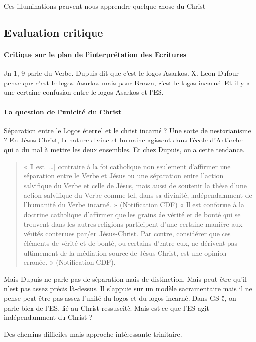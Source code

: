  
Ces illuminations peuvent nous apprendre quelque chose du Christ

\subsection{ Evaluation critique }

\paragraph{ Critique sur le plan de l’interprétation des Ecritures  } Jn 1, 9 parle du Verbe. Dupuis dit que c’est le logos Asarkos. X. Leon-Dufour pense que c’est le logos Asarkos mais pour Brown, c’est le logos incarné. Et il y a une certaine confusion entre le logos Asarkos et l’ES.

\paragraph{ La question de l’unicité du Christ} Séparation entre le Logos éternel et le christ incarné ? Une sorte de nestorianisme ? En Jésus Christ, la nature divine et humaine agissent dans l’école d’Antioche qui a du mal à mettre les deux ensembles. Et chez Dupuis, on a cette tendance.
\begin{quote}
    « Il est […] contraire à la foi catholique non seulement d’affirmer une séparation entre le Verbe et Jésus ou une séparation entre l’action salvifique du Verbe et celle de Jésus, mais aussi de soutenir la thèse d’une action salvifique du Verbe comme tel, dans sa divinité, indépendamment de l’humanité du Verbe incarné. » (Notification CDF) « Il est conforme à la doctrine catholique d’affirmer que les grains de vérité et de bonté qui se trouvent dans les autres religions participent d’une certaine manière aux vérités contenues par/en Jésus-Christ. Par contre, considérer que ces éléments de vérité et de bonté, ou certains d’entre eux, ne dérivent pas ultimement de la médiation-source de Jésus-Christ, est une opinion erronée. » (Notification CDF).
\end{quote}


Mais Dupuis ne parle pas de séparation mais de distinction. Mais peut être qu’il n’est pas assez précis là-dessus. Il s’appuie sur un modèle sacramentaire mais il ne pense peut être pas assez l’unité du logos et du logos incarné.
Dans GS 5, on parle bien de l’ES, lié au Christ ressuscité. Mais est ce que l’ES agit indépendamment du Christ ?
\begin{Synthesis}
Des chemins difficiles mais approche intéressante trinitaire.
\end{Synthesis}

